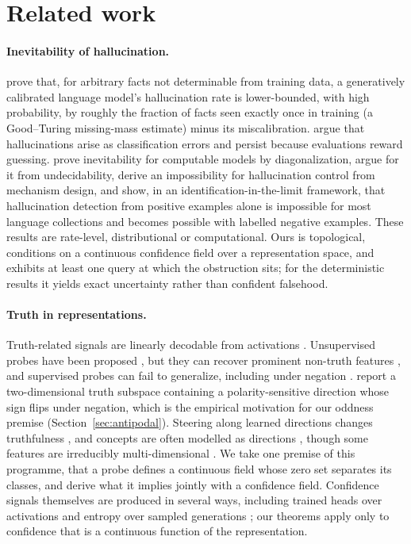 \documentclass[10pt]{article}
\theoremstyle{definition}
\theoremstyle{remark}
\begin{document}
\section{Related work}
\label{sec:related}

\paragraph{Inevitability of hallucination.}
\citet{kalai2024calibrated} prove that, for arbitrary facts not
determinable from training data, a generatively calibrated language
model's hallucination rate is lower-bounded, with high probability, by
roughly the fraction of facts seen exactly once in training (a
Good--Turing missing-mass estimate) minus its miscalibration.
\citet{kalai2025why} argue that hallucinations arise as classification
errors and persist because evaluations reward guessing.
\citet{xu2024hallucination} prove inevitability for computable models by
diagonalization, \citet{banerjee2024llms} argue for it from
undecidability, \citet{karpowicz2025fundamental} derive an impossibility
for hallucination control from mechanism design, and
\citet{karbasi2025impossibility} show, in an identification-in-the-limit
framework, that hallucination detection from positive examples alone is
impossible for most language collections and becomes possible with
labelled negative examples. These results are
rate-level, distributional or computational. Ours is topological,
conditions on a continuous confidence field over a representation space,
and exhibits at least one query at which the obstruction sits; for the deterministic
results it yields exact uncertainty rather than confident falsehood.

\paragraph{Truth in representations.}
Truth-related signals are linearly decodable from activations
\citep{marks2024geometry,azaria2023internal}. Unsupervised probes have
been proposed \citep{burns2023discovering}, but they can recover
prominent non-truth features \citep{farquhar2023challenges}, and
supervised probes can fail to generalize, including under negation
\citep{levinstein2024still}. \citet{burger2024truth} report a
two-dimensional truth subspace containing a polarity-sensitive direction
whose sign flips under negation, which is the empirical motivation for
our oddness premise (Section~\ref{sec:antipodal}). Steering along learned
directions changes truthfulness \citep{li2023inference,zou2023representation},
and concepts are often modelled as directions \citep{park2024linear},
though some features are irreducibly multi-dimensional
\citep{engels2025not}. We take one premise of this programme, that a
probe defines a continuous field whose zero set separates its classes,
and derive what it implies jointly with a confidence field. Confidence
signals themselves are produced in several ways, including trained heads
over activations \citep{kadavath2022language} and entropy over sampled
generations \citep{farquhar2024detecting}; our theorems apply only to
confidence that is a continuous function of the representation.
\end{document}
